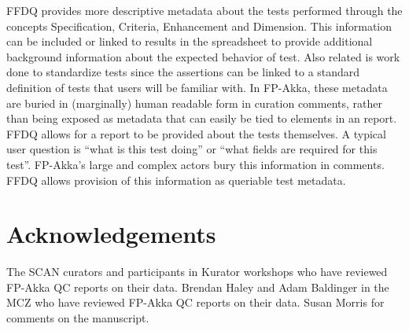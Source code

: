 \documentclass{article}
\begin{document}
FFDQ provides more descriptive metadata about the tests performed through the concepts Specification, Criteria, Enhancement and Dimension. This information can be included or linked to results in the spreadsheet to provide additional background information about the expected behavior of test. Also related is work done to standardize tests since the  assertions can be linked to a standard definition of tests that users will be familiar with.
In FP-Akka, these metadata are buried in (marginally) human readable form in curation comments, rather than being exposed as metadata that can easily be tied to elements in an report.  FFDQ allows for a report to be provided about the tests themselves.  A typical user question is ``what is this test doing'' or ``what fields are required for this test''.  FP-Akka's large and complex actors bury this information in comments.  FFDQ allows provision of this information as queriable test metadata.

\section{Acknowledgements}
The SCAN curators and participants in Kurator workshops who have reviewed FP-Akka QC reports on their data.  
Brendan Haley and Adam Baldinger in the MCZ who have reviewed FP-Akka QC reports on their data.
Susan Morris for comments on the manuscript.



\newpage
{}
\end{document}
